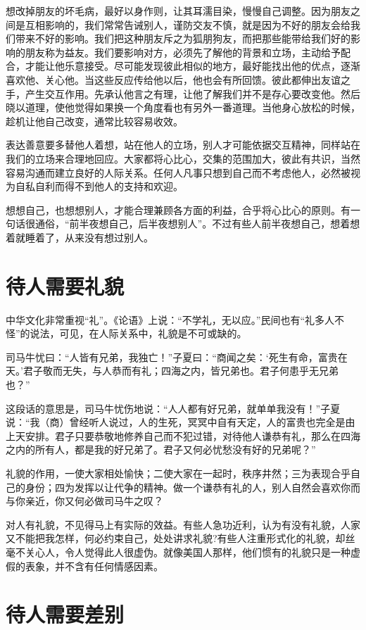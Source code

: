 \documentclass[fontset=fandol, a4paper, 12pt, openright]{ctexbook}
\begin{document}
想改掉朋友的坏毛病，最好以身作则，让其耳濡目染，慢慢自己调整。因为朋友之间是互相影响的，我们常常告诫别人，谨防交友不慎，就是因为不好的朋友会给我们带来不好的影响。我们把这种朋友斥之为狐朋狗友，而把那些能带给我们好的影响的朋友称为益友。我们要影响对方，必须先了解他的背景和立场，主动给予配合，才能让他乐意接受。尽可能发现彼此相似的地方，最好能找出他的优点，逐渐喜欢他、关心他。当这些反应传给他以后，他也会有所回馈。彼此都伸出友谊之手，产生交互作用。先承认他言之有理，让他了解我们并不是存心要改变他。然后晓以道理，使他觉得如果换一个角度看也有另外一番道理。当他身心放松的时候，趁机让他自己改变，通常比较容易收效。

表达善意要多替他人着想，站在他人的立场，别人才可能依据交互精神，同样站在我们的立场来合理地回应。大家都将心比心，交集的范围加大，彼此有共识，当然容易沟通而建立良好的人际关系。任何人凡事只想到自己而不考虑他人，必然被视为自私自利而得不到他人的支持和欢迎。

想想自己，也想想别人，才能合理兼顾各方面的利益，合乎将心比心的原则。有一句话很通俗，“前半夜想自己，后半夜想别人”。不过有些人前半夜想自己，想着想着就睡着了，从来没有想过别人。

\section{待人需要礼貌}

中华文化非常重视“礼”。《论语》上说：“不学礼，无以应。”民间也有“礼多人不怪”的说法，可见，在人际关系中，礼貌是不可或缺的。

司马牛忧曰：“人皆有兄弟，我独亡！”子夏曰：“商闻之矣：‘死生有命，富贵在天。’君子敬而无失，与人恭而有礼；四海之内，皆兄弟也。君子何患乎无兄弟也？”

这段话的意思是，司马牛忧伤地说：“人人都有好兄弟，就单单我没有！”子夏说：“我（商）曾经听人说过，人的生死，冥冥中自有天定，人的富贵也完全是由上天安排。君子只要恭敬地修养自己而不犯过错，对待他人谦恭有礼，那么在四海之内的所有人，都是我的好兄弟了。君子又何必忧愁没有好的兄弟呢？”

礼貌的作用，一使大家相处愉快；二使大家在一起时，秩序井然；三为表现合乎自己的身份；四为发挥以让代争的精神。做一个谦恭有礼的人，别人自然会喜欢你而与你亲近，你又何必做司马牛之叹？

对人有礼貌，不见得马上有实际的效益。有些人急功近利，认为有没有礼貌，人家又不能把我怎样，何必约束自己，处处讲求礼貌?有些人注重形式化的礼貌，却丝毫不关心人，令人觉得此人很虚伪。就像美国人那样，他们惯有的礼貌只是一种虚假的表象，并不含有任何情感因素。

\section{待人需要差别}
\end{document}
